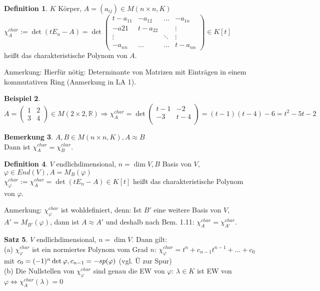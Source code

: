 \documentclass[10pt,a4paper,numbers=endperiod]{scrartcl}
\theoremstyle{definition}
\newtheorem{satz}{Satz}[section]
\newtheorem{defi}[satz]{Definition}
\newtheorem{bem}[satz]{Bemerkung}
\newtheorem{bsp}[satz]{Beispiel}
\def\RR{{\mathbb R}}
\begin{document}
\begin{defi}
	$K$ Körper, $A = (a_{ij}) \in M(n\times n, K)$\\
	$\chi_A^{char} := \det(t E_n - A) = \det \begin{pmatrix}
	t - a_{11} & -a_{12}& \dots &-a_{1n}\\
	-a{21}& t-a_{22}&& \vdots\\
	\vdots&&\ddots & \vdots\\
	-a_{nn} & \dots & \dots  & t - a_{nn}
	\end{pmatrix} \in K[t]$\\ 
	heißt das charakteristische Polynom von $A$.
\end{defi}
Anmerkung: Hierfür nötig: Determinante von Matrizen mit Einträgen in einem kommutativen Ring (Anmerkung in LA 1). 

\begin{bsp}
	$A = \begin{pmatrix}
	1 & 2\\
	3 & 4
	\end{pmatrix} \in M(2 \times 2, \RR) \Rightarrow \chi_A^{char} = \det \begin{pmatrix}
	t-1 & -2\\
	-3 & t-4\\
	\end{pmatrix} = (t-1) (t-4) - 6 = t^2 - 5t-2$
\end{bsp}

\begin{bem}
	$A, B \in M(n \times n, K), A \approx B$\\
	Dann ist $\chi_A^{char} = \chi_B^{char}$. 
\end{bem}

\begin{defi}
	$V$ endlichdimensional, $n = \dim V, B$ Basis von $V$, $\varphi \in End(V), A = M_B (\varphi)$\\
	$\chi_\varphi^{char} := \chi_A^{char} = \det(t E_n - A) \in K[t]$ heißt das charakteristische Polynom von $\varphi$. 
\end{defi}

Anmerkung: $\chi_\varphi^{char}$ ist wohldefiniert, denn: Ist $B'$ eine weitere Basis von $V$, $A' = M_{B'} (\varphi)$, dann ist $A \approx A'$ und deshalb nach Bem. 1.11: $\chi_A^{char} = \chi_{A'}^{char}$.

\begin{satz}
	$V$ endlichdimensional, $n = \dim V$. Dann gilt:\\
	(a) $\chi_{\varphi}^{char}$ ist ein normiertes Polynom vom Grad $n$: $\chi_\varphi^{char} = t^n + c_{n-1} t^{n-1} + \ldots + c_0$ mit $c_0 = (-1)^n \det \varphi,\\
	c_{n-1} = -sp(\varphi)$ (vgl. Ü zur Spur)\\
	(b) Die Nullstellen von $\chi_\varphi^{char}$ sind genau die EW von $\varphi$: $\lambda \in K$ ist EW von $\varphi \Leftrightarrow \chi_A^{char} (\lambda) = 0$
\end{satz}
\end{document}
